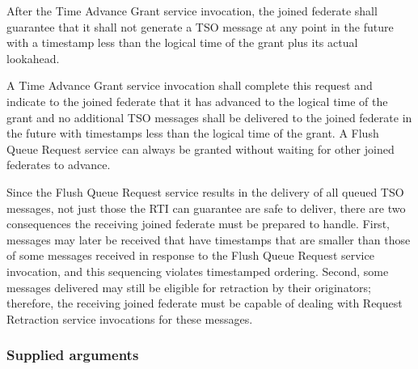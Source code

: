 \begin{compactstdpage}
    After the Time Advance Grant \rtiinitiated{} service invocation, the joined federate shall guarantee that it shall not generate a TSO message at any point in the future with a timestamp less than the logical time of the grant plus its actual lookahead.

    A Time Advance Grant \rtiinitiated{} service invocation shall complete this request and indicate to the joined federate that it has advanced to the logical time of the grant and no additional TSO messages shall be delivered to the joined federate in the future with timestamps less than the logical time of the grant. A Flush Queue Request service can always be granted without waiting for other joined federates to advance.

    Since the Flush Queue Request service results in the delivery of all queued TSO messages, not just those the RTI can guarantee are safe to deliver, there are two consequences the receiving joined federate must be prepared to handle. First, messages may later be received that have timestamps that are smaller than those of some messages received in response to the Flush Queue Request service invocation, and this sequencing violates timestamped ordering. Second, some messages delivered may still be eligible for retraction by their originators; therefore, the receiving joined federate must be capable of dealing with Request Retraction \rtiinitiated{} service invocations for these messages.

    \subsubsection{Supplied arguments}



\end{compactstdpage}

\clearpage

